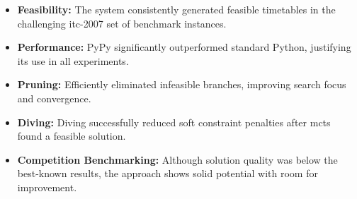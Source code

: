 \begin{itemize}
\item \textbf{Feasibility:} The system consistently generated feasible timetables in the challenging \ac{itc-2007} set of benchmark instances.

\item \textbf{Performance:} PyPy significantly outperformed standard Python, justifying its use in all experiments.

\item \textbf{Pruning:} Efficiently eliminated infeasible branches, improving search focus and convergence.

\item \textbf{Diving:} Diving successfully reduced soft constraint penalties after \ac{mcts} found a feasible solution.

\item \textbf{Competition Benchmarking:} Although solution quality was below the best-known results, the approach shows solid potential with room for improvement.
\end{itemize}